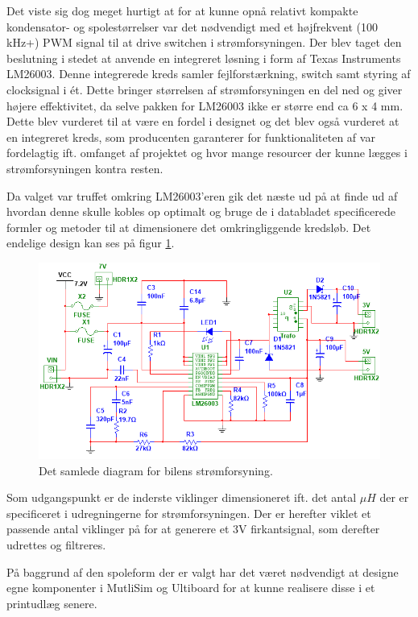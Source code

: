 Det viste sig dog meget hurtigt at for at kunne opnå relativt kompakte kondensator- og spolestørrelser var det nødvendigt med et højfrekvent (100 kHz+) PWM signal til at drive switchen i strømforsyningen.
Der blev taget den beslutning i stedet at anvende en integreret løsning i form af Texas Instruments LM26003\cite{lib:lm26003}. 
Denne integrerede kreds samler fejlforstærkning, switch samt styring af clocksignal i ét.
Dette bringer størrelsen af strømforsyningen en del ned og giver højere effektivitet, da selve pakken for LM26003 ikke er større end ca 6 x 4 mm.
Dette blev vurderet til at være en fordel i designet og det blev også vurderet at en integreret kreds, som producenten garanterer for funktionaliteten af var fordelagtig ift. omfanget af projektet og hvor mange resourcer der kunne lægges i strømforsyningen kontra resten.

Da valget var truffet omkring LM26003'eren gik det næste ud på at finde ud af hvordan denne skulle kobles op optimalt og bruge de i databladet specificerede formler og metoder til at dimensionere det omkringliggende kredsløb.
Det endelige design kan ses på figur \ref{fig:bil_psu}.

\begin{figure}[h]
\centering
\includegraphics[width=\textwidth]{../fig/diagrammer/bil/psu_kredsloeb}
\caption{Det samlede diagram for bilens strømforsyning.}
\label{fig:bil_psu}
\end{figure}

Som udgangspunkt er de inderste viklinger dimensioneret ift. det antal $\mu H$ der er specificeret i udregningerne\cite{lib:psu_calcs} for strømforsyningen.
Der er herefter viklet et passende antal viklinger på for at generere et 3V firkantsignal, som derefter udrettes og filtreres.

På baggrund af den spoleform der er valgt har det været nødvendigt at designe egne komponenter i MutliSim og Ultiboard for at kunne realisere disse i et printudlæg senere.
